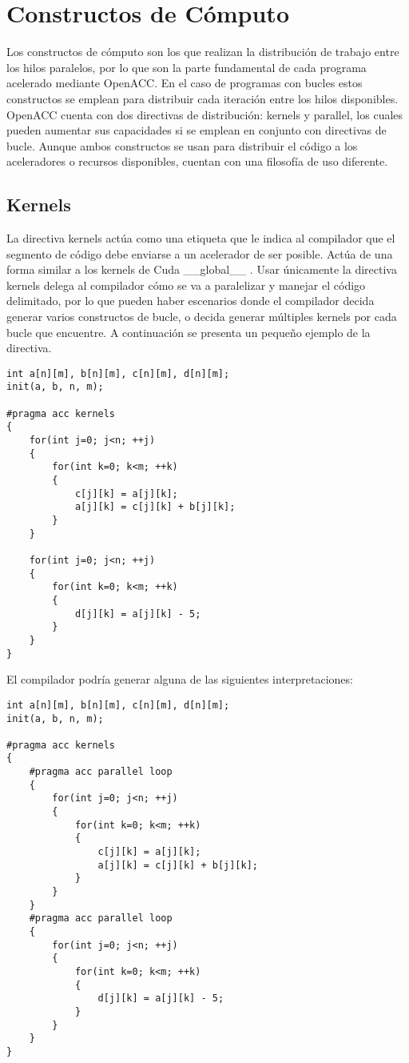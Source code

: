 \chapter{Constructos de Cómputo}
Los constructos de cómputo son los que realizan la distribución de trabajo entre los hilos paralelos, por lo que son la parte fundamental de cada programa acelerado mediante OpenACC. En el caso de programas con bucles estos constructos se emplean para distribuir cada iteración entre los hilos disponibles. OpenACC cuenta con dos directivas de distribución: kernels y parallel, los cuales pueden aumentar sus capacidades si se emplean en conjunto con directivas de bucle. Aunque ambos constructos se usan para distribuir el código a los aceleradores o recursos disponibles, cuentan con una filosofía de uso diferente.

\section{Kernels}
La directiva kernels actúa como una etiqueta que le indica al compilador que el segmento de código debe enviarse a un acelerador de ser posible. Actúa de una forma similar a los kernels de Cuda \_\_global\_\_ \cite{cuda}. Usar únicamente la directiva kernels delega al compilador cómo se va a paralelizar y manejar el código delimitado, por lo que pueden haber escenarios donde el compilador decida generar varios constructos de bucle, o decida generar múltiples kernels por cada bucle que encuentre. A continuación se presenta un pequeño ejemplo de la directiva.


\begin{lstlisting}[style=CStyle]
int a[n][m], b[n][m], c[n][m], d[n][m];
init(a, b, n, m);

#pragma acc kernels
{
    for(int j=0; j<n; ++j)
    {
        for(int k=0; k<m; ++k)
        {
            c[j][k] = a[j][k];
            a[j][k] = c[j][k] + b[j][k];
        }
    }

    for(int j=0; j<n; ++j)
    {
        for(int k=0; k<m; ++k)
        {
            d[j][k] = a[j][k] - 5;
        }
    }
}
\end{lstlisting}

El compilador podría generar alguna de las siguientes interpretaciones:
\begin{lstlisting}[style=CStyle]
int a[n][m], b[n][m], c[n][m], d[n][m];
init(a, b, n, m);

#pragma acc kernels
{
    #pragma acc parallel loop
    {
        for(int j=0; j<n; ++j)
        {
            for(int k=0; k<m; ++k)
            {
                c[j][k] = a[j][k];
                a[j][k] = c[j][k] + b[j][k];
            }
        }
    }
    #pragma acc parallel loop
    {
        for(int j=0; j<n; ++j)
        {
            for(int k=0; k<m; ++k)
            {
                d[j][k] = a[j][k] - 5;
            }
        }
    }
}
\end{lstlisting}

